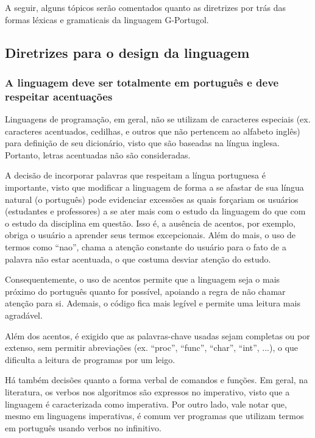 \documentclass[a4paper,11pt]{report}
\begin{document}
A seguir, alguns tópicos serão comentados quanto as diretrizes por trás das
formas léxicas e gramaticais da linguagem G-Portugol.

\subsection{Diretrizes para o design da linguagem}

\subsubsection{A linguagem deve ser totalmente em português e deve respeitar
acentuações}

Linguagens de programação, em geral, não se utilizam de caracteres especiais
(ex. caracteres acentuados, cedilhas, e outros que não pertencem ao alfabeto
inglês) para definição de seu dicionário, visto que são baseadas na língua
inglesa. Portanto, letras acentuadas não são consideradas.

A decisão de incorporar palavras que respeitam a língua portuguesa é importante,
visto que modificar a linguagem de forma a se afastar de sua língua natural (o
português) pode evidenciar excessões as quais forçariam os usuários (estudantes
e professores) a se ater mais com o estudo da linguagem do que com o estudo da
disciplina em questão. Isso é, a ausência de acentos, por exemplo, obriga o
usuário a aprender seus termos excepcionais. Além do mais, o uso de termos como
``nao'', chama a atenção constante do usuário para o fato de a palavra não estar
acentuada, o que costuma desviar atenção do estudo.

Consequentemente, o uso de acentos permite que a linguagem seja o mais próximo
do português quanto for possível, apoiando a regra de não chamar atenção para
si. Ademais, o código fica mais legível e permite uma leitura mais agradável.

Além dos acentos, é exigido que as palavras-chave usadas sejam completas ou por
extenso, sem permitir abreviações (ex. ``proc'', ``func'', ``char'', ``int'',
...), o que dificulta a leitura de programas por um leigo.

Há também decisões quanto a forma verbal de comandos e funções. Em geral, na
literatura, os verbos nos algoritmos são expressos no imperativo, visto que a
linguagem é caracterizada como imperativa. Por outro lado, vale notar que, mesmo
em linguagens imperativas, é comum ver programas que utilizam termos em
português usando verbos no infinitivo.
\end{document}
